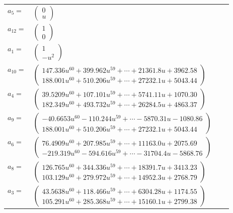 \documentclass[1p]{elsarticle_modified}
\theoremstyle{definition}
\begin{document}
\begin{tabular}{m{7pt} m{180pt} m{7pt} m{180pt} }
\flushright $a_{5}=$&$\begin{pmatrix}0\\u\end{pmatrix}$ \\
\flushright $a_{12}=$&$\begin{pmatrix}1\\0\end{pmatrix}$ \\
\flushright $a_{1}=$&$\begin{pmatrix}1\\- u^2\end{pmatrix}$ \\
\flushright $a_{10}=$&$\begin{pmatrix}147.336 u^{60}+399.962 u^{59}+\cdots+21361.8 u+3962.58\\188.001 u^{60}+510.206 u^{59}+\cdots+27232.1 u+5043.44\end{pmatrix}$ \\
\flushright $a_{4}=$&$\begin{pmatrix}39.5209 u^{60}+107.101 u^{59}+\cdots+5741.11 u+1070.30\\182.349 u^{60}+493.732 u^{59}+\cdots+26284.5 u+4863.37\end{pmatrix}$ \\
\flushright $a_{9}=$&$\begin{pmatrix}-40.6653 u^{60}-110.244 u^{59}+\cdots-5870.31 u-1080.86\\188.001 u^{60}+510.206 u^{59}+\cdots+27232.1 u+5043.44\end{pmatrix}$ \\
\flushright $a_{6}=$&$\begin{pmatrix}76.4909 u^{60}+207.985 u^{59}+\cdots+11163.0 u+2075.69\\-219.319 u^{60}-594.616 u^{59}+\cdots-31704.4 u-5868.76\end{pmatrix}$ \\
\flushright $a_{8}=$&$\begin{pmatrix}126.765 u^{60}+344.336 u^{59}+\cdots+18391.7 u+3413.23\\103.129 u^{60}+279.972 u^{59}+\cdots+14952.3 u+2768.79\end{pmatrix}$ \\
\flushright $a_{3}=$&$\begin{pmatrix}43.5638 u^{60}+118.466 u^{59}+\cdots+6304.28 u+1174.55\\105.291 u^{60}+285.368 u^{59}+\cdots+15160.1 u+2799.38\end{pmatrix}$ \\

\end{tabular}
\end{document}

